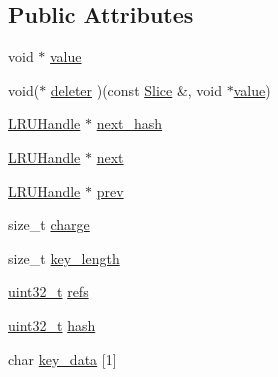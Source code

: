 \subsection*{Public Attributes}
\begin{DoxyCompactItemize}
\item 
void $\ast$ \hyperlink{structleveldb_1_1anonymous__namespace_02cache_8cc_03_1_1_l_r_u_handle_aafc92b461c4b11883c567bc0edbfb661}{value}
\item 
void($\ast$ \hyperlink{structleveldb_1_1anonymous__namespace_02cache_8cc_03_1_1_l_r_u_handle_a2fa2d3a4fa2534c8c06037977c8f7aff}{deleter} )(const \hyperlink{classleveldb_1_1_slice}{Slice} \&, void $\ast$\hyperlink{structleveldb_1_1anonymous__namespace_02cache_8cc_03_1_1_l_r_u_handle_aafc92b461c4b11883c567bc0edbfb661}{value})
\item 
\hyperlink{structleveldb_1_1anonymous__namespace_02cache_8cc_03_1_1_l_r_u_handle}{L\+R\+U\+Handle} $\ast$ \hyperlink{structleveldb_1_1anonymous__namespace_02cache_8cc_03_1_1_l_r_u_handle_a9d8fe4b53bca073d8c26782461500cc7}{next\+\_\+hash}
\item 
\hyperlink{structleveldb_1_1anonymous__namespace_02cache_8cc_03_1_1_l_r_u_handle}{L\+R\+U\+Handle} $\ast$ \hyperlink{structleveldb_1_1anonymous__namespace_02cache_8cc_03_1_1_l_r_u_handle_a9ba545cbb798351cd8b6852efb0037cf}{next}
\item 
\hyperlink{structleveldb_1_1anonymous__namespace_02cache_8cc_03_1_1_l_r_u_handle}{L\+R\+U\+Handle} $\ast$ \hyperlink{structleveldb_1_1anonymous__namespace_02cache_8cc_03_1_1_l_r_u_handle_a01f6ab7f3fa74c2b7a9482904e143308}{prev}
\item 
size\+\_\+t \hyperlink{structleveldb_1_1anonymous__namespace_02cache_8cc_03_1_1_l_r_u_handle_ab6bc9a6237113c0a60486f11e4dc0f06}{charge}
\item 
size\+\_\+t \hyperlink{structleveldb_1_1anonymous__namespace_02cache_8cc_03_1_1_l_r_u_handle_a893c0044d01b75d0c909a095bb55a6c7}{key\+\_\+length}
\item 
\hyperlink{stdint_8h_a435d1572bf3f880d55459d9805097f62}{uint32\+\_\+t} \hyperlink{structleveldb_1_1anonymous__namespace_02cache_8cc_03_1_1_l_r_u_handle_a0bb548c2cd6df282ee42c6548522de83}{refs}
\item 
\hyperlink{stdint_8h_a435d1572bf3f880d55459d9805097f62}{uint32\+\_\+t} \hyperlink{structleveldb_1_1anonymous__namespace_02cache_8cc_03_1_1_l_r_u_handle_ac19d1b9a4e2f7bf20ad679532b9f843d}{hash}
\item 
char \hyperlink{structleveldb_1_1anonymous__namespace_02cache_8cc_03_1_1_l_r_u_handle_ae824982f7623e01e04e52818909378de}{key\+\_\+data} \mbox{[}1\mbox{]}
\end{DoxyCompactItemize}


